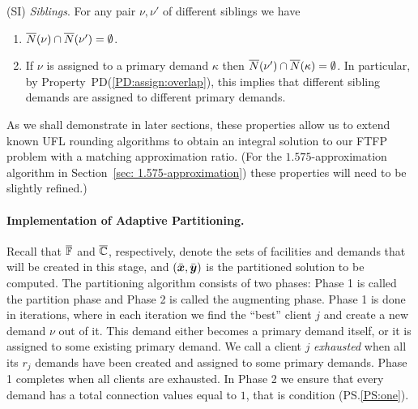 \documentclass{llncs}
\begin{document}
\begin{description}
\begin{enumerate}
\begin{enumerate}
			\end{enumerate}

	\end{enumerate}
	
\item{(SI)} \emph{Siblings}. For any pair $\nu,\nu'$ of different siblings we have
  \begin{enumerate}

	\item \label{SI:siblings disjoint}
		  ${\overline{N}}(\nu)\cap {\overline{N}}(\nu') = \emptyset$.
		
	\item \label{SI:primary disjoint} If $\nu$ is assigned to a primary demand $\kappa$ then
 		${\overline{N}}(\nu')\cap {\overline{N}}(\kappa) = \emptyset$. In particular, by Property~PD(\ref{PD:assign:overlap}),
		this implies that different sibling demands are assigned to different primary demands.

	\end{enumerate}
	
\end{description}

As we shall demonstrate in later sections, these properties allow us
to extend known UFL rounding algorithms to obtain an integral solution
to our FTFP problem with a matching approximation ratio. (For the
$1.575$-approximation algorithm in Section~\ref{sec: 1.575-approximation}) 
these properties will need to be slightly refined.)


\paragraph{Implementation of Adaptive Partitioning.}
 Recall that
$\overline{\mathbb{F}}$ and $\overline{\mathbb{C}}$, respectively, denote the
sets of facilities and demands that will be created in this
stage, and $(\bar{\boldsymbol{x}},\bar{\boldsymbol{y}})$ is the partitioned solution
to be computed. 
The  partitioning algorithm consists of two phases:
Phase 1 is called the partition phase and Phase 2 is called
the augmenting phase. Phase 1 is done in iterations, where
in each iteration we find the ``best'' client $j$ and create a
new demand $\nu$ out of it. This demand either becomes a
primary demand itself, or it is assigned to some existing
primary demand. We call a client $j$ \emph{exhausted} when
all its $r_j$ demands have been created and assigned to some
primary demands. Phase 1 completes when all clients are
exhausted. In Phase 2 we ensure that every demand has a
total connection values equal to $1$, that is condition (PS.\ref{PS:one}).
\end{document}
